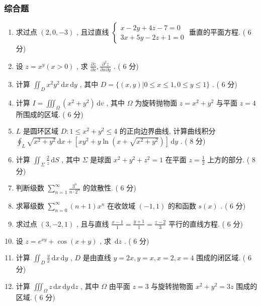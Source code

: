 \documentclass[cn,11pt,fancy,hide]{elegantbook}
\newcommand{\dd}{\,\mathrm{d}}
\renewcommand{\leq}{\leqslant}
\begin{document}
\subsubsection{综合题}
\begin{enumerate}
	\item 求过点 $(2,0,-3)$ , 且过直线 $\begin{cases}
	x-2 y+4 z-7=0\\
	3 x+5 y-2 z+1=0
	\end{cases}$ 垂直的平面方程. ( $6$ 分)
	
	\item 设 $z=x^{y}(x>0)$ , 求 $\frac{\partial z}{\partial x}, \frac{\partial^{2} z}{\partial x \partial y}$ . ( $6$ 分)
	
	\item 计算 $\iint_{D} x^{2} y^{2} \dd x \dd y$ , 其中 $D=\{(x, y) | 0 \leq x \leq 1,0 \leq y \leq 1\}$ . ( $6$ 分)
	
	\item 计算 $I=\iiint_{\Omega}\left(x^{2}+y^{2}\right) \dd v$ , 其中 $\Omega$ 为旋转抛物面 $z=x^{2}+y^{2}$ 与平面 $z=4$ 所围成的区域. ( $6$ 分)
	
	\item $L$ 是圆环区域 $D : 1 \leq x^{2}+y^{2} \leq 4$ 的正向边界曲线, 计算曲线积分 $\oint_{L} \sqrt{x^{2}+y^{2}} \dd x+\left[x y^{2}+y \ln \left(x+\sqrt{x^{2}+y^{2}}\right)\right] \dd y$ . ( $8$ 分)
	
	\item 计算 $\iint_{\Sigma} \frac{2}{z} \dd S$ , 其中 $\Sigma$ 是球面 $x^{2}+y^{2}+z^{2}=1$ 在平面 $z=\frac{1}{2}$ 上方的部分. ( $8$ 分)
	
	\item 判断级数 $\sum_{n=1}^{\infty} \frac{3^{n}}{n \cdot 2^{n}}$ 的敛散性. ( $6$ 分)
	
	\item 求幂级数 $\sum_{n=0}^{\infty}(n+1) x^{n}$ 在收敛域 $(-1,1)$ 的和函数 $s(x)$ . ( $6$ 分)
	
	\item 求过点 $(3,-2,1)$ ,  且与直线 $\frac{x-1}{1}=\frac{y+1}{1}=\frac{z-2}{3}$ 平行的直线方程. ( $6$ 分)
	
	\item 设 $ z = e^{xy} + \cos(x + y)$ , 求 $\dd z$ . ( $6$ 分)
	
	\item 计算 $\iint_{D}\frac{y}{x}\dd x\dd y$ , $D$ 是由直线 $ y = 2x,y = x, x = 2, x = 4$ 围成的闭区域. ( $6$ 分)
	
	\item 计算 $\iiint_{\Omega}z\dd x\dd y\dd z$ , 其中 $\Omega$ 由平面 $z = 3$ 与旋转抛物面 $x^2 + y^2 = 3z$ 围成的区域. ( $6$ 分)
	

\end{enumerate}
\end{document}

